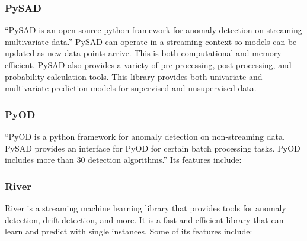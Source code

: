 \subsubsection{PySAD}

\enquote{PySAD is an open-source python framework for anomaly detection on streaming multivariate data.} \parencite{pysad} PySAD can operate in a streaming context so models can be updated as new data points arrive. This is both computational and memory efficient. PySAD also provides a variety of pre-processing, post-processing, and probability calculation tools. This library provides both univariate and multivariate prediction models for supervised and unsupervised data. 

\subsubsection{PyOD}

\enquote{PyOD is a python framework for anomaly detection on non-streaming data. PySAD provides an interface for PyOD for certain batch processing tasks. PyOD includes more than 30 detection algorithms.} \parencite{zhao2019pyod} Its features include:

\subsubsection{River}

River is a streaming machine learning library that provides tools for anomaly detection, drift detection, and more. It is a fast and efficient library that can learn and predict with single instances. Some of its features include:


